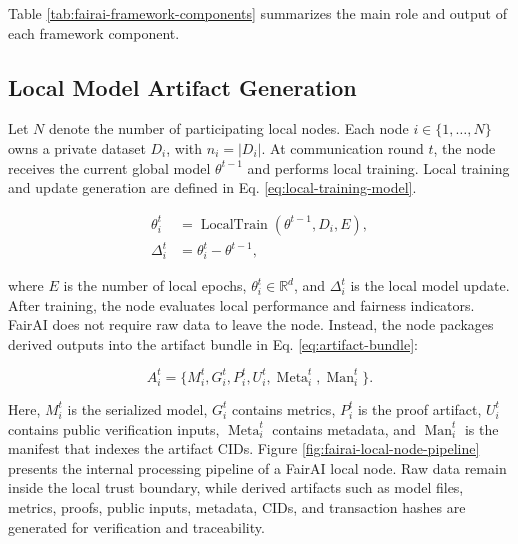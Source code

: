 \documentclass[futureinternet,article,submit,pdftex,moreauthors]{Definitions/mdpi}
\begin{document}
Table \ref{tab:fairai-framework-components} summarizes the main role and output of each framework component.

\subsection{Local Model Artifact Generation}
\label{subsec:local-artifact-generation}

Let \(N\) denote the number of participating local nodes. Each node \(i \in \{1,\ldots,N\}\) owns a private dataset \(D_i\), with \(n_i = |D_i|\). At communication round \(t\), the node receives the current global model \(\theta^{t-1}\) and performs local training. Local training and update generation are defined in Eq. \eqref{eq:local-training-model}.

\begin{subequations}
	\label{eq:local-training-model}
	\begin{align}
		\theta_i^t
		&=
		\operatorname{LocalTrain}(\theta^{t-1},D_i,E),
		\label{eq:local-training}
		\\
		\Delta_i^t
		&=
		\theta_i^t-\theta^{t-1},
		\label{eq:local-update}
	\end{align}
\end{subequations}

where \(E\) is the number of local epochs, \(\theta_i^t \in \mathbb{R}^{d}\), and \(\Delta_i^t\) is the local model update. After training, the node evaluates local performance and fairness indicators. FairAI does not require raw data to leave the node. Instead, the node packages derived outputs into the artifact bundle in Eq. \eqref{eq:artifact-bundle}:

\begin{equation}
	\label{eq:artifact-bundle}
	A_i^t =
	\{
	M_i^t,
	G_i^t,
	P_i^t,
	U_i^t,
	\operatorname{Meta}_i^t,
	\operatorname{Man}_i^t
	\}.
\end{equation}

Here, \(M_i^t\) is the serialized model, \(G_i^t\) contains metrics, \(P_i^t\) is the proof artifact, \(U_i^t\) contains public verification inputs, \(\operatorname{Meta}_i^t\) contains metadata, and \(\operatorname{Man}_i^t\) is the manifest that indexes the artifact CIDs. Figure \ref{fig:fairai-local-node-pipeline} presents the internal processing pipeline of a FairAI local node. Raw data remain inside the local trust boundary, while derived artifacts such as model files, metrics, proofs, public inputs, metadata, CIDs, and transaction hashes are generated for verification and traceability.
\end{document}

